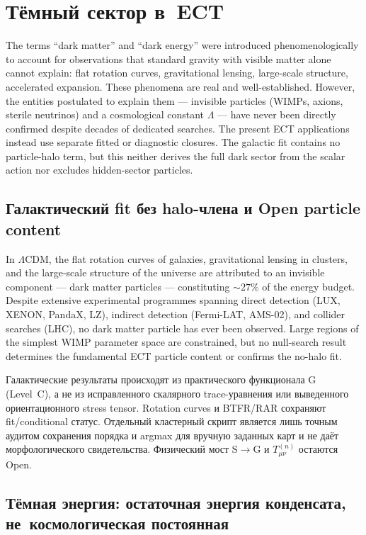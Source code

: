 \documentclass[11pt,a4paper]{article}
\begin{document}
\section{Тёмный сектор в~ECT}
\label{sec:pop_dark}

The terms ``dark matter'' and ``dark energy'' were introduced phenomenologically to account for observations that standard gravity with visible matter alone cannot explain: flat rotation curves, gravitational lensing, large-scale structure, accelerated expansion. These phenomena are real and well-established. However, the entities postulated to explain them --- invisible particles (WIMPs, axions, sterile neutrinos) and a cosmological constant $\Lambda$ --- have never been directly confirmed despite decades of dedicated searches. The present ECT applications instead use separate fitted or diagnostic closures.  The galactic fit contains no particle-halo term, but this neither derives the full dark sector from the scalar action nor excludes hidden-sector particles.

\subsection{Галактический fit без halo-члена и Open particle content}

In $\Lambda$CDM, the flat rotation curves of galaxies, gravitational lensing in clusters, and the large-scale structure of the universe are attributed to an invisible component --- dark matter particles --- constituting $\sim 27\%$ of the energy budget. Despite extensive experimental programmes spanning direct detection (LUX, XENON, PandaX, LZ), indirect detection (Fermi-LAT, AMS-02), and collider searches (LHC), no dark matter particle has ever been observed. Large regions of the simplest WIMP parameter space are constrained, but no null-search result determines the fundamental ECT particle content or confirms the no-halo fit.

Галактические результаты происходят из практического функционала G (Level~C), а не из исправленного скалярного trace-уравнения или выведенного ориентационного stress tensor.  Rotation curves и BTFR/RAR сохраняют fit/conditional статус.  Отдельный кластерный скрипт является лишь точным аудитом сохранения порядка и argmax для вручную заданных карт и не даёт морфологического свидетельства.  Физический мост S$\to$G и $T^{(n)}_{\mu\nu}$ остаются Open.

\subsection{Тёмная энергия: остаточная энергия конденсата, не~космологическая постоянная}
\end{document}
